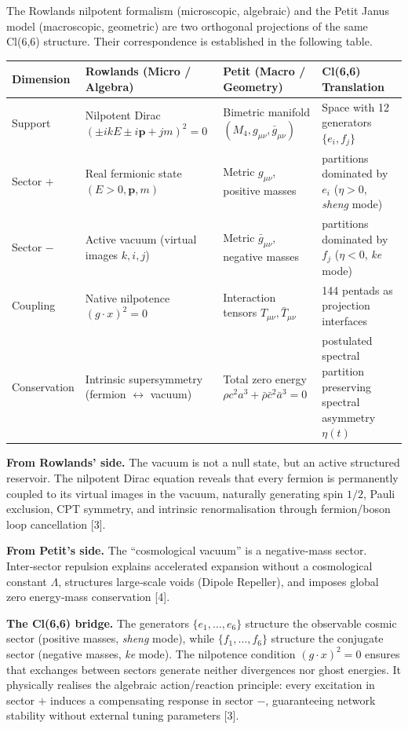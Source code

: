 \documentclass[11pt]{article}
\begin{document}
The Rowlands nilpotent formalism (microscopic, algebraic) and the Petit
Janus model (macroscopic, geometric) are two orthogonal projections of
the same Cl(6,6) structure. Their correspondence is established in the
following table.

\begin{table}[H]
\centering
\small
\begin{tabularx}{\textwidth}{@{}lXXX@{}}
\toprule
\textbf{Dimension} & \textbf{Rowlands (Micro / Algebra)} & \textbf{Petit (Macro / Geometry)} & \textbf{Cl(6,6) Translation} \\
\midrule
Support & Nilpotent Dirac $(\pm ikE \pm i\mathbf{p} + jm)^2 = 0$ & Bimetric manifold $(M_4, g_{\mu\nu}, \bar{g}_{\mu\nu})$ & Space with 12 generators $\{e_i, f_j\}$ \\
Sector $+$ & Real fermionic state $(E >0, \mathbf{p}, m)$ & Metric $g_{\mu\nu}$, positive masses & partitions dominated by $e_i$ ($\eta >0$, \textit{sheng} mode) \\
Sector $-$ & Active vacuum (virtual images $k,i,j$) & Metric $\bar{g}_{\mu\nu}$, negative masses & partitions dominated by $f_j$ ($\eta <0$, \textit{ke} mode) \\
Coupling & Native nilpotence $(g\cdot x)^2 = 0$ & Interaction tensors $T_{\mu\nu}, \bar{T}_{\mu\nu}$ & 144 pentads as projection interfaces \\
Conservation & Intrinsic supersymmetry (fermion $\leftrightarrow$ vacuum) & Total zero energy $\rho c^2 a^3 + \bar{\rho}\bar{c}^2\bar{a}^3 = 0$ & postulated spectral partition preserving spectral asymmetry $\eta(t)$ \\
\bottomrule
\end{tabularx}
\end{table}

\textbf{From Rowlands' side.} The vacuum is not a null state, but an
active structured reservoir. The nilpotent Dirac equation reveals that
every fermion is permanently coupled to its virtual images in the
vacuum, naturally generating spin \(1/2\), Pauli exclusion, CPT
symmetry, and intrinsic renormalisation through fermion/boson loop
cancellation {[}3{]}.

\textbf{From Petit's side.} The ``cosmological vacuum'' is a
negative‑mass sector. Inter‑sector repulsion explains accelerated
expansion without a cosmological constant \(\Lambda\), structures
large‑scale voids (Dipole Repeller), and imposes global zero energy‑mass
conservation {[}4{]}.

\textbf{The Cl(6,6) bridge.} The generators \(\{e_1,\dots,e_6\}\)
structure the observable cosmic sector (positive masses, \textit{sheng}
mode), while \(\{f_1,\dots,f_6\}\) structure the conjugate sector
(negative masses, \textit{ke} mode). The nilpotence condition
\((g\cdot x)^2 = 0\) ensures that exchanges between sectors generate
neither divergences nor ghost energies. It physically realises the
algebraic action/reaction principle: every excitation in sector \(+\)
induces a compensating response in sector \(-\), guaranteeing network
stability without external tuning parameters {[}3{]}.
\end{document}
